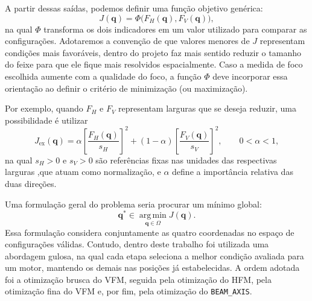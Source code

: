 \documentclass[12pt,a4paper]{article}
\begin{document}
A partir dessas saídas, podemos definir uma função objetivo genérica:
\begin{equation}
    J(\mathbf{q})=\Phi\bigl(F_H(\mathbf{q}),F_V(\mathbf{q})\bigr),
    \label{eq:objetivo-foco-generico}
\end{equation}
na qual $\Phi$ transforma os dois indicadores em um valor utilizado para comparar as configurações. Adotaremos a convenção de que valores menores de $J$ representam condições mais favoráveis, dentro do projeto faz mais sentido reduzir o tamanho do feixe para que ele fique mais resolvidos espacialmente. Caso a medida de foco escolhida aumente com a qualidade do foco, a função $\Phi$ deve incorporar essa orientação ao definir o critério de minimização (ou maximização).

Por exemplo, quando $F_H$ e $F_V$ representam larguras que se deseja reduzir, uma possibilidade é utilizar
\begin{equation}
    J_{\mathrm{ex}}(\mathbf{q})=
    \alpha\left[\frac{F_H(\mathbf{q})}{s_H}\right]^2+
    (1-\alpha)\left[\frac{F_V(\mathbf{q})}{s_V}\right]^2,
    \qquad 0<\alpha<1,
    \label{eq:objetivo-foco}
\end{equation}
na qual $s_H>0$ e $s_V>0$ são referências fixas nas unidades das respectivas larguras ,que atuam como normalização, e $\alpha$ define a importância relativa das duas direções. 

Uma formulação geral do problema seria procurar um mínimo global:
\begin{equation}
    \mathbf{q}^{*}\in\operatorname*{arg\,min}_{\mathbf{q}\in\Omega}J(\mathbf{q}).
    \label{eq:minimizacao-foco}
\end{equation}
Essa formulação considera conjuntamente as quatro coordenadas no espaço de configurações válidas. Contudo, dentro deste trabalho foi utilizada uma abordagem gulosa, na qual cada etapa seleciona a melhor condição avaliada para um motor, mantendo os demais nas posições já estabelecidas. A ordem adotada foi a otimização brusca do VFM, seguida pela otimização do HFM, pela otimização fina do VFM e, por fim, pela otimização do \texttt{BEAM\_AXIS}.
\end{document}
